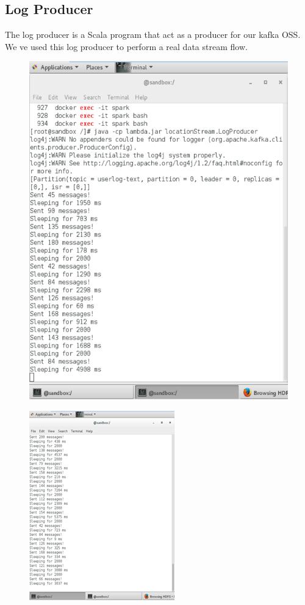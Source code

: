 \subsection{Log Producer}
\label{sec:sec01}
The log producer is a Scala program that act as a producer for our kafka OSS. We ve used this log producer to perform
a real data stream flow.
\begin{figure}[h!]
	\centering
	\includegraphics[height=0.3\textheight]{fig01/logProducer}
	\label{fig:FilialesEtClients}
\end{figure}
\begin{figure}[h!]
	\centering
	\includegraphics[height=0.6\textheight]{fig01/logProducer1}
	\label{fig:FilialesEtClients}
\end{figure}
